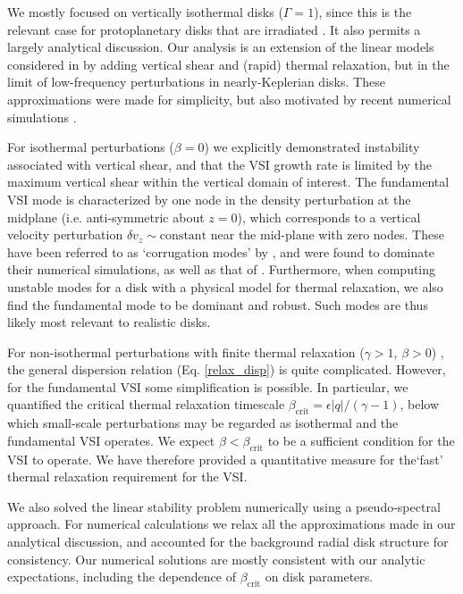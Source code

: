 
We mostly focused on vertically isothermal disks ($\Gamma=1$), since
this is the relevant case for protoplanetary disks that are irradiated
\citep{chiang97}. It also permits a largely analytical discussion.  Our analysis is an
extension of the linear models considered in \cite{lubow93} by 
adding vertical shear and (rapid) thermal relaxation, but in the limit of low-frequency
perturbations in nearly-Keplerian disks. These approximations were
made for simplicity, but also motivated by recent numerical
simulations \citep{nelson13}.   

For isothermal perturbations ($\beta=0$) we explicitly
demonstrated instability  associated with vertical shear, and that the 
VSI growth rate is limited by the maximum vertical shear within the 
vertical domain of interest. The fundamental VSI mode is characterized
by one node in the density perturbation at the midplane 
(i.e. anti-symmetric about $z=0$), which corresponds to a vertical
velocity perturbation  $\delta v_z\sim\mathrm{constant}$ near the
mid-plane with zero nodes. These have been referred to as
`corrugation modes' by \cite{nelson13}, and were found to dominate
their numerical simulations, as well as that of
\cite{stoll14}. Furthermore, when computing unstable modes for a
disk with a physical model for thermal relaxation, we also find
the fundamental mode to be dominant and robust. Such modes are thus
likely most relevant to  realistic disks. 

For non-isothermal  perturbations with finite thermal relaxation ($\gamma>1$,
$\beta>0$) , the general dispersion relation (Eq. \ref{relax_disp}) is
quite complicated. However, for the 
fundamental VSI some simplification is  possible. In particular, we
quantified the critical thermal relaxation timescale
$\beta_\mathrm{crit}=\epsilon|q|/(\gamma-1)$, below which small-scale
perturbations may be regarded as isothermal and the fundamental VSI
operates.  We expect $\beta<\beta_\mathrm{crit}$ to be a sufficient
condition for the VSI to operate. We have therefore provided a
quantitative measure for the`fast' thermal relaxation requirement for the
VSI. 

We also solved the linear stability problem numerically using a
pseudo-spectral approach. For numerical calculations we relax all the
approximations made in our analytical discussion, and accounted for
the background radial disk structure for consistency.  Our
numerical solutions are mostly consistent with our analytic 
expectations, including the dependence of $\beta_\mathrm{crit}$ on
disk parameters.  

